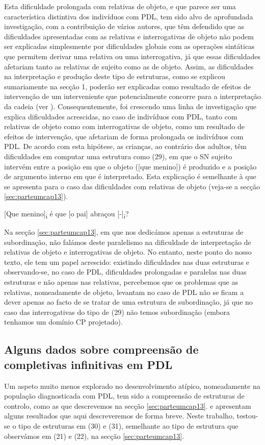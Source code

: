 \documentclass[output=paper,colorlinks,citecolor=brown,booklanguage=portuguese]{langscibook}
\begin{document}
Esta dificuldade prolongada com relativas de objeto, e que parece ser uma característica distintiva dos indivíduos com PDL, tem sido alvo de aprofundada investigação, com a contribuição de vários autores, que têm defendido que as dificuldades apresentadas com as relativas e interrogativas de objeto não podem ser explicadas simplesmente por dificuldades globais com as operações sintáticas que permitem derivar uma relativa ou uma interrogativa, já que essas dificuldades afetariam tanto as relativas de sujeito como as de objeto. Assim, as dificuldades na interpretação e produção deste tipo de estruturas, como se explicou sumariamente na secção 1, poderão ser explicadas como resultado de efeitos de intervenção de um interveniente que potencialmente concorre para a interpretação da cadeia (ver \citealp{Friedmann2011}). Consequentemente, foi crescendo uma linha de investigação que explica dificuldades acrescidas, no caso de indivíduos com PDL, tanto com relativas de objeto como com interrogativas de objeto, como um resultado de efeitos de intervenção, que afetariam de forma prolongada os indivíduos com PDL. De acordo com esta hipótese, as crianças, ao contrário dos adultos, têm dificuldades em computar uma estrutura como (29), em que o SN sujeito intervém entre a posição em que o objeto ([que menino]) é produzido e a posição de argumento interno em que é interpretado. Esta explicação é semelhante à que se apresenta para o caso das dificuldades com relativas de objeto (veja-se a secção \ref{sec:parteumcap13}). 

\ea
    \label{ex:13:29} 	[Que menino]\textsubscript{i} é que [o pai] abraçou [-]\textsubscript{i}?
\z

Na secção \ref{sec:parteumcap13}, em que nos dedicámos apenas a estruturas de subordinação, não falámos deste paralelismo na dificuldade de interpretação de relativas de objeto e interrogativas de objeto. No entanto, neste ponto do nosso texto, ele tem um papel acrescido: existindo dificuldades nas duas estruturas e observando-se, no caso de PDL, dificuldades prolongadas e paralelas nas duas estruturas e não apenas nas relativas, percebemos que os problemas que as relativas, nomeadamente de objeto, levantam no caso de PDL não se ficam a dever apenas ao facto de se tratar de uma estrutura de subordinação, já que no caso das interrogativas do tipo de (29) não temos subordinação (embora tenhamos um domínio CP projetado).

\subsection{Alguns dados sobre compreensão de completivas infinitivas em PDL}\label{sec:partedoispontoquatrocap13}
Um aspeto muito menos explorado no desenvolvimento atípico, nomeadamente na população diagnosticada com PDL, tem sido a compreensão de estruturas de controlo, como as que descrevemos na secção \ref{sec:parteumcap13}.  \citet{Martins2018} e \citet{Martinsempreparacao} apresentam alguns resultados que aqui descreveremos de forma breve. Neste trabalho, testou-se o tipo de estruturas em (30) e (31), semelhante ao tipo de estrutura que observámos em (21) e (22), na secção \ref{sec:parteumcap13}. 
\end{document}
